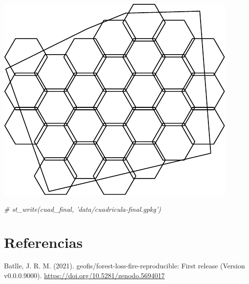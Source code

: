 \documentclass[11pt,]{article}
\newenvironment{Shaded}{\begin{snugshade}}{\end{snugshade}}
\newcommand{\CommentTok}[1]{\textcolor[rgb]{0.56,0.35,0.01}{\textit{#1}}}
\newcommand{\DataTypeTok}[1]{\textcolor[rgb]{0.13,0.29,0.53}{#1}}
\newcommand{\KeywordTok}[1]{\textcolor[rgb]{0.13,0.29,0.53}{\textbf{#1}}}
\newcommand{\NormalTok}[1]{#1}
\newcommand{\OperatorTok}[1]{\textcolor[rgb]{0.81,0.36,0.00}{\textbf{#1}}}
\newcommand{\StringTok}[1]{\textcolor[rgb]{0.31,0.60,0.02}{#1}}
\begin{document}
\begin{Shaded}
\end{Shaded}

\includegraphics{README_files/figure-latex/unnamed-chunk-1-2.pdf}

\begin{Shaded}
\begin{Highlighting}[]
\CommentTok{# st_write(cuad_final, 'data/cuadricula-final.gpkg')}
\end{Highlighting}
\end{Shaded}

\hypertarget{referencias}{%
\section*{Referencias}\label{referencias}}

\hypertarget{refs}{}
\leavevmode\hypertarget{ref-jose_ramon_martinez_batlle_2021_5694017}{}%
Batlle, J. R. M. (2021). geofis/forest-loss-fire-reproducible: First
release (Version v0.0.0.9000).
\url{https://doi.org/10.5281/zenodo.5694017}




\newpage
\singlespacing 
\end{document}
